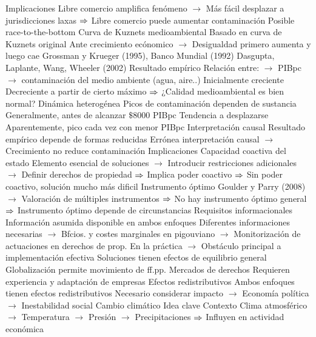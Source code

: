 \documentclass{nuevotema}
\begin{document}
\begin{esquemal}
				\4 Implicaciones
				\4[] Libre comercio amplifica fenómeno
				\4[] $\to$ Más fácil desplazar a jurisdicciones laxas
				\4[] $\Rightarrow$ Libre comercio puede aumentar contaminación
				\4[] Posible race-to-the-bottom
			\3 Curva de Kuznets medioambiental
				\4 Basado en curva de Kuznets original
				\4[] Ante crecimiento ecónomico
				\4[] $\to$ Desigualdad primero aumenta y luego cae
				\4 Grossman y Krueger (1995), Banco Mundial (1992)
				\4 Dasgupta, Laplante, Wang, Wheeler (2002)
				\4 Resultado empírico
				\4[] Relación entre:
				\4[] $\to$ PIBpc
				\4[] $\to$ contaminación del medio ambiente (agua, aire..)
				\4[] Inicialmente creciente
				\4[] Decreciente a partir de cierto máximo
				\4[] $\Rightarrow$ ¿Calidad medioambiental es bien normal?
				\4 Dinámica heterogénea
				\4[] Picos de contaminación dependen de sustancia
				\4[] Generalmente, antes de alcanzar $\$8000$ PIBpc
				\4 Tendencia a desplazarse
				\4[] Aparentemente, pico cada vez con menor PIBpc
				\4 Interpretación causal
				\4[] Resultado empírico depende de formas reducidas
				\4[] Errónea interpretación causal
				\4[] $\to$ Crecimiento no reduce contaminación
			\3 Implicaciones
				\4 Capacidad coactiva del estado
				\4[] Elemento esencial de soluciones
				\4[] $\to$ Introducir restricciones adicionales
				\4[] $\to$ Definir derechos de propiedad
				\4[] $\Rightarrow$ Implica poder coactivo
				\4[] $\Rightarrow$ Sin poder coactivo, solución mucho más dificil
				\4 Instrumento óptimo
				\4[] Goulder y Parry (2008)
				\4[] $\to$ Valoración de múltiples instrumentos
				\4[] $\Rightarrow$ No hay instrumento óptimo general
				\4[] $\Rightarrow$ Instrumento óptimo depende de circunstancias
				\4 Requisitos informacionales
				\4[] Información asumida disponible en ambos enfoques
				\4[] Diferentes informaciones necesarias
				\4[] $\to$ Bfcios. y costes marginales en pigouviano
				\4[] $\to$ Monitorización de actuaciones en derechos de prop.
				\4[] En la práctica
				\4[] $\to$ Obstáculo principal a implementación efectiva
				\4 Soluciones tienen efectos de equilibrio general
				\4[] Globalización permite movimiento de ff.pp.
				\4 Mercados de derechos
				\4[] Requieren experiencia y adaptación de empresas
				\4 Efectos redistributivos
				\4[] Ambos enfoques tienen efectos redistributivos
				\4[] Necesario considerar impacto
				\4[] $\to$ Economía política
				\4[] $\to$ Inestabilidad social
		\2 Cambio climático
			\3 Idea clave
				\4 Contexto
				\4[] Clima atmosférico
				\4[] $\to$ Temperatura
				\4[] $\to$ Presión
				\4[] $\to$ Precipitaciones
				\4[] $\Rightarrow$ Influyen en actividad económica

\end{esquemal}
\end{document}
